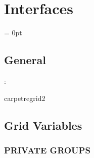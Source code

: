 \section{Interfaces} 


\parskip = 0pt

\vspace{3mm} \subsection*{General}

: 

carpetregrid2
\vspace{2mm}
\subsection*{Grid Variables}
\vspace{5mm}\subsubsection{PRIVATE GROUPS}

\vspace{5mm}

